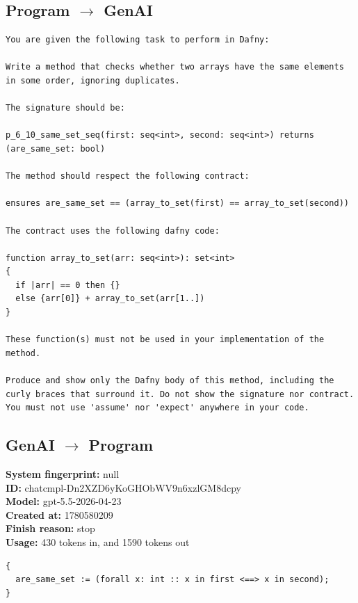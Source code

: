 \documentclass{article}
\begin{document}
\subsection*{Program $\rightarrow$ GenAI}
\begin{lstlisting}
You are given the following task to perform in Dafny:

Write a method that checks whether two arrays have the same elements in some order, ignoring duplicates.

The signature should be:

p_6_10_same_set_seq(first: seq<int>, second: seq<int>) returns (are_same_set: bool)

The method should respect the following contract:

ensures are_same_set == (array_to_set(first) == array_to_set(second))

The contract uses the following dafny code:

function array_to_set(arr: seq<int>): set<int>
{
  if |arr| == 0 then {}
  else {arr[0]} + array_to_set(arr[1..])
}

These function(s) must not be used in your implementation of the method.

Produce and show only the Dafny body of this method, including the curly braces that surround it. Do not show the signature nor contract. You must not use 'assume' nor 'expect' anywhere in your code.
\end{lstlisting}
\subsection*{GenAI $\rightarrow$ Program}
\textbf{System fingerprint: }null
\\\textbf{ID: }chatcmpl-Dn2XZD6yKoGHObWV9n6xzlGM8dcpy
\\\textbf{Model: }gpt-5.5-2026-04-23
\\\textbf{Created at: }1780580209
\\\textbf{Finish reason: }stop
\\\textbf{Usage: }430 tokens in, and 1590 tokens out
\begin{lstlisting}
{
  are_same_set := (forall x: int :: x in first <==> x in second);
}
\end{lstlisting}
\end{document}
